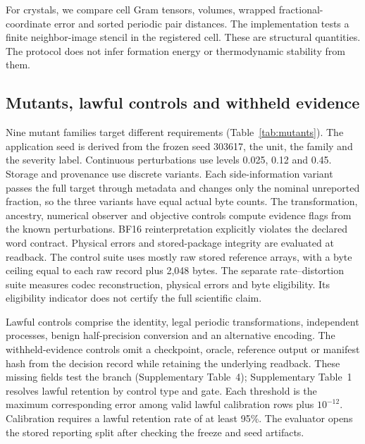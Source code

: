 \documentclass[10pt,a4paper,twocolumn]{article}
\newcommand{\gate}[1]{\text{\textbf{#1}}}
\begin{document}
For crystals, we compare cell Gram tensors, volumes, wrapped fractional-coordinate error and sorted periodic pair distances. The implementation tests a finite neighbor-image stencil in the registered cell. These are structural quantities. The protocol does not infer formation energy or thermodynamic stability from them.



\subsection{Mutants, lawful controls and withheld evidence}
Nine mutant families target different requirements (Table~\ref{tab:mutants}). The application seed is derived from the frozen seed 303617, the unit, the family and the severity label. Continuous perturbations use levels 0.025, 0.12 and 0.45. Storage and provenance use discrete variants. Each side-information variant passes the full target through metadata and changes only the nominal unreported fraction, so the three variants have equal actual byte counts. The transformation, ancestry, numerical observer and objective controls compute evidence flags from the known perturbations. BF16 reinterpretation explicitly violates the declared word contract. Physical errors and stored-package integrity are evaluated at readback. The control suite uses mostly raw stored reference arrays, with a byte ceiling equal to each raw record plus 2,048 bytes. The separate rate--distortion suite measures codec reconstruction, physical errors and byte eligibility. Its eligibility indicator does not certify the full scientific claim.

Lawful controls comprise the identity, legal periodic transformations, independent processes, benign half-precision conversion and an alternative encoding. The withheld-evidence controls omit a checkpoint, oracle, reference output or manifest hash from the decision record while retaining the underlying readback. These missing fields test the \gate{ABSTAIN} branch (Supplementary Table~4); Supplementary Table~1 resolves lawful retention by control type and gate. Each threshold is the maximum corresponding error among valid lawful calibration rows plus $10^{-12}$. Calibration requires a lawful retention rate of at least 95\%. The evaluator opens the stored reporting split after checking the freeze and seed artifacts.
\end{document}
